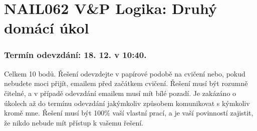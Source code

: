 \documentclass[a4paper,12pt]{article}
\begin{document}
\section*{NAIL062 V\&P Logika: Druhý domácí  úkol}

\subsubsection*{Termín odevzdání: 18. 12. v 10:40.}
Celkem 10 bodů. Řešení odevzdejte v papírové podobě na cvičení nebo, pokud nebudete moci přijít, emailem před začátkem cvičení. Řešení musí být rozumně čitelné, a v případě odevzdání emailem musí mít bílé pozadí. Je zakázáno o úkolech až do termínu odevzdání jakýmkoliv způsobem komunikovat s kýmkoliv kromě mne. Řešení musí být 100\% vaší vlastní prací, a je vaší povinností zajistit, že nikdo nebude mít přístup k vašemu řešení.

\bigskip
\end{document}
